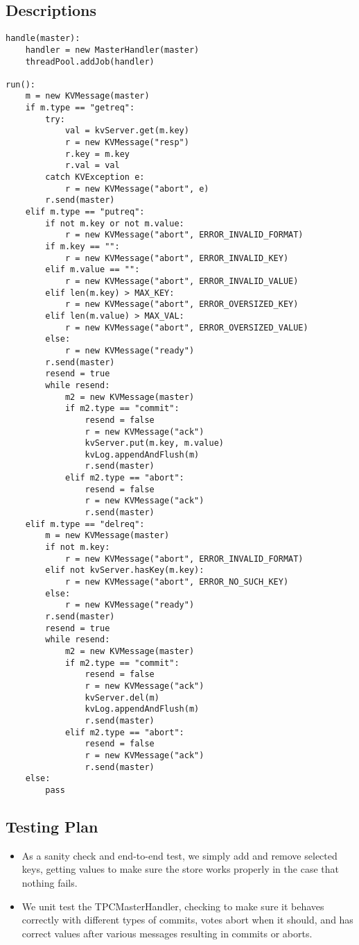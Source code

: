 \subsection{Descriptions}
\begin{verbatim}
handle(master):
    handler = new MasterHandler(master)
    threadPool.addJob(handler)

run():
    m = new KVMessage(master)
    if m.type == "getreq":
        try:
            val = kvServer.get(m.key)
            r = new KVMessage("resp")
            r.key = m.key
            r.val = val
        catch KVException e:
            r = new KVMessage("abort", e)
        r.send(master)
    elif m.type == "putreq":
        if not m.key or not m.value:
            r = new KVMessage("abort", ERROR_INVALID_FORMAT)
        if m.key == "":
            r = new KVMessage("abort", ERROR_INVALID_KEY)
        elif m.value == "":
            r = new KVMessage("abort", ERROR_INVALID_VALUE)
        elif len(m.key) > MAX_KEY:
            r = new KVMessage("abort", ERROR_OVERSIZED_KEY)
        elif len(m.value) > MAX_VAL:
            r = new KVMessage("abort", ERROR_OVERSIZED_VALUE)
        else:
            r = new KVMessage("ready")
        r.send(master)
        resend = true
        while resend:
            m2 = new KVMessage(master)
            if m2.type == "commit":
                resend = false
                r = new KVMessage("ack")
                kvServer.put(m.key, m.value)
                kvLog.appendAndFlush(m)
                r.send(master)
            elif m2.type == "abort":
                resend = false
                r = new KVMessage("ack")
                r.send(master)
    elif m.type == "delreq":
        m = new KVMessage(master)
        if not m.key:
            r = new KVMessage("abort", ERROR_INVALID_FORMAT)
        elif not kvServer.hasKey(m.key):
            r = new KVMessage("abort", ERROR_NO_SUCH_KEY)
        else:
            r = new KVMessage("ready")
        r.send(master)
        resend = true
        while resend:
            m2 = new KVMessage(master)
            if m2.type == "commit":
                resend = false
                r = new KVMessage("ack")
                kvServer.del(m)
                kvLog.appendAndFlush(m)
                r.send(master)
            elif m2.type == "abort":
                resend = false
                r = new KVMessage("ack")
                r.send(master)
    else:
        pass
\end{verbatim}
\subsection{Testing Plan}
\begin{itemize}
\item As a sanity check and end-to-end test, we simply add and remove selected keys, getting values to make sure the store works properly in the case that nothing fails.
\item We unit test the TPCMasterHandler, checking to make sure it behaves correctly with different types of commits, votes abort when it should, and has correct values after various messages resulting in commits or aborts.
\end{itemize}
